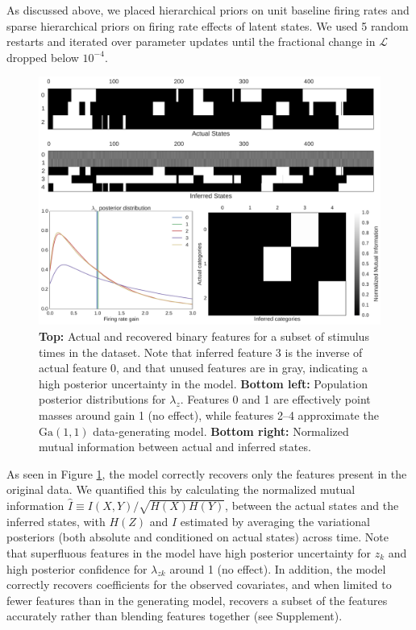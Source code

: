 \documentclass{article} %
\begin{document}
As discussed above, we placed hierarchical priors on unit baseline firing rates and sparse hierarchical priors on firing rate effects of latent states. We used 5 random restarts and iterated over parameter updates until the fractional change in $\mathcal{L}$ dropped below $10^{-4}$.

\begin{figure}[ht]
    \center
    \includegraphics[width=0.6\linewidth]{figures/synthetic}
    \caption{\textbf{Top:} Actual and recovered binary features for a subset of stimulus times in the dataset. Note that inferred feature 3 is the inverse of actual feature 0, and that unused features are in gray, indicating a high posterior uncertainty in the model. \textbf{Bottom left:} Population posterior distributions for $\lambda_z$. Features 0 and 1 are effectively point masses around gain 1 (no effect), while features 2--4 approximate the $\text{Ga}(1, 1)$ data-generating model. \textbf{Bottom right:} Normalized mutual information between actual and inferred states.}
    \label{synthetic}
\end{figure}

As seen in Figure \ref{synthetic}, the model correctly recovers only the features present in the original data. We quantified this by calculating the normalized mutual information $\hat{I}\equiv I(X, Y)/\sqrt{H(X)H(Y)}$, between the actual states and the inferred states, with $H(Z)$ and $I$ estimated by averaging the variational posteriors (both absolute and conditioned on actual states) across time. Note that superfluous features in the model have high posterior uncertainty for $z_k$ and high posterior confidence for $\lambda_{zk}$ around 1 (no effect). In addition, the model correctly recovers coefficients for the observed covariates, and when limited to fewer features than in the generating model, recovers a subset of the features accurately rather than blending features together (see Supplement).
\end{document}
